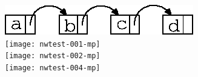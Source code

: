 \documentclass{article}
\begin{document}
\includegraphics[width=0.8\linewidth]{test-004-mp}\\
\texttt{[image: nwtest-001-mp]}\\
\texttt{[image: nwtest-002-mp]}\\
\texttt{[image: nwtest-004-mp]}
\end{document}
